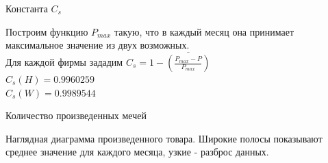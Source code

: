 \documentclass[8pt]{beamer}
\begin{document}
\begin{frame}{Константа $C_s$}
\begin{figure}[h]
\label{ris:2.png}
\end{figure}
Построим функцию $P_{max}$ такую, что в каждый месяц она принимает максимальное значение из двух возможных.\\
Для каждой фирмы зададим $C_s = 1 - \overline{(\frac{P_{max} - P}{P_{max}})}$\\
$C_s(H) = 0.9960259$\\
$C_s(W) = 0.9989544$
\end{frame}

\begin{frame}{Количество произведенных мечей}
\begin{figure}[h]
\label{ris:3.png}
\end{figure}
Наглядная диаграмма произведенного товара. Широкие полосы показывают среднее значение для каждого месяца, узкие - разброс данных.\\
\end{frame}
\end{document}
